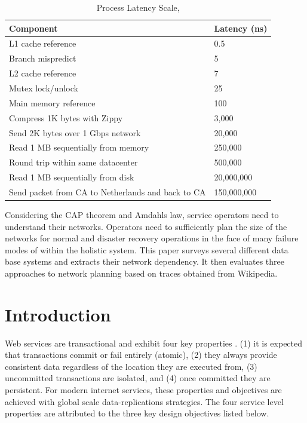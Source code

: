 \documentclass[conference]{IEEEtran}
\begin{document}
\begin{table}[htbp]
\caption{ Process Latency Scale, \cite{Dean}}
\begin{center}
\begin{tabular}{ll}
\hline
\textbf{Component} 					& \textbf{Latency} (ns)	\\
\hline
L1 cache reference					& 0.5					\\
Branch mispredict 					& 5					\\
L2 cache reference					& 7                     \\
Mutex lock/unlock					& 25					\\
Main memory reference				& 100					\\
Compress 1K bytes with Zippy 		& 3,000					\\
Send 2K bytes over 1 Gbps network	& 20,000				\\
Read 1 MB sequentially from memory	& 250,000				\\
Round trip within same datacenter	& 500,000				\\
Read 1 MB sequentially from disk	& 20,000,000			\\
Send packet from CA to Netherlands and back to CA 	& 150,000,000			\\
\hline
\end{tabular}
\label{dean}
\end{center}
\end{table}

Considering the CAP theorem and Amdahls law, service operators need to understand their networks. Operators need to sufficiently plan the size of the networks for normal and disaster recovery operations in the face of many failure modes of within the holistic system. This paper surveys several different data base systems and extracts their network dependency. It then evaluates three approaches to network planning based on traces obtained from Wikipedia.


\section{Introduction}

Web services are transactional and exhibit four key properties \cite{CAP}. (1) it is expected that transactions commit or fail entirely (atomic), (2) they always provide consistent data regardless of the location they are executed from, (3) uncommitted transactions are isolated, and (4) once committed they are persistent. For modern internet services, these properties and objectives are achieved with global scale data-replications strategies. The four service level properties are attributed to the three key design objectives listed below. 
\end{document}
